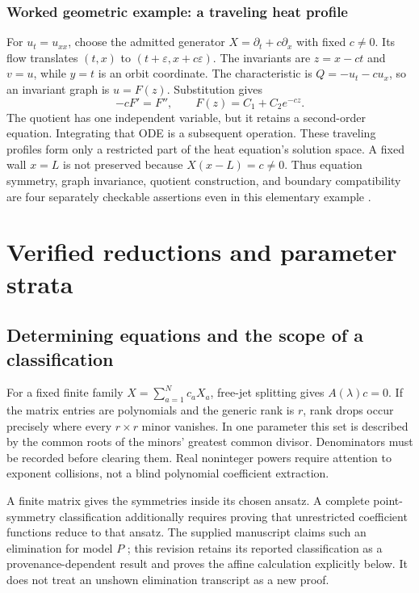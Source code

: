 \documentclass[11pt,a4paper,oneside]{report}
\numberwithin{equation}{chapter}
\begin{document}
\subsection*{Worked geometric example: a traveling heat profile}
For $u_t=u_{xx}$, choose the admitted generator $X=\partial_t+c\partial_x$ with fixed $c\ne0$. Its flow translates $(t,x)$ to $(t+\varepsilon,x+c\varepsilon)$. The invariants are $z=x-ct$ and $v=u$, while $y=t$ is an orbit coordinate. The characteristic is $Q=-u_t-cu_x$, so an invariant graph is $u=F(z)$. Substitution gives
\begin{equation}
-cF'=F'',\qquad F(z)=C_1+C_2e^{-cz}.
\end{equation}
The quotient has one independent variable, but it retains a second-order equation. Integrating that ODE is a subsequent operation. These traveling profiles form only a restricted part of the heat equation's solution space. A fixed wall $x=L$ is not preserved because $X(x-L)=c\ne0$. Thus equation symmetry, graph invariance, quotient construction, and boundary compatibility are four separately checkable assertions even in this elementary example \cite{olver}.



\chapter{Verified reductions and parameter strata}\label{ch:reduction}
\section{Determining equations and the scope of a classification}
For a fixed finite family $X=\sum_{a=1}^Nc_aX_a$, free-jet splitting gives $A(\lambda)c=0$. If the matrix entries are polynomials and the generic rank is $r$, rank drops occur precisely where every $r\times r$ minor vanishes. In one parameter this set is described by the common roots of the minors' greatest common divisor. Denominators must be recorded before clearing them. Real noninteger powers require attention to exponent collisions, not a blind polynomial coefficient extraction.

A finite matrix gives the symmetries inside its chosen ansatz. A complete point-symmetry classification additionally requires proving that unrestricted coefficient functions reduce to that ansatz. The supplied manuscript claims such an elimination for model $P$ \cite{projectdraft}; this revision retains its reported classification as a provenance-dependent result and proves the affine calculation explicitly below. It does not treat an unshown elimination transcript as a new proof.
\end{document}
